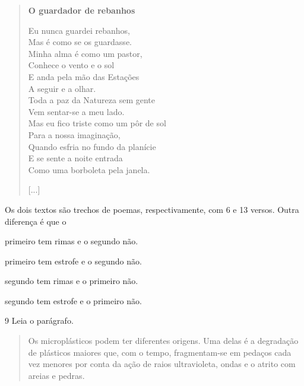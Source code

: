 \begin{verse}
\textbf{O guardador de rebanhos}

Eu nunca guardei rebanhos,\\
Mas é como se os guardasse.\\
Minha alma é como um pastor,\\
Conhece o vento e o sol\\
E anda pela mão das Estações\\
A seguir e a olhar.\\
Toda a paz da Natureza sem gente\\
Vem sentar-se a meu lado.\\
Mas eu fico triste como um pôr de sol\\
Para a nossa imaginação,\\
Quando esfria no fundo da planície\\
E se sente a noite entrada\\
Como uma borboleta pela janela.

{[}...{]}

\end{verse}

Os dois textos são trechos de poemas, respectivamente, com 6 e 13
versos. Outra diferença é que o

\begin{escolha}
\item primeiro tem rimas e o segundo não.

\item primeiro tem estrofe e o segundo não.

\item segundo tem rimas e o primeiro não.

\item segundo tem estrofe e o primeiro não.
\end{escolha}


\num{9} Leia o parágrafo.

\begin{quote}
Os microplásticos podem ter diferentes origens. Uma delas é a degradação
de plásticos maiores que, com o tempo, fragmentam-se em pedaços cada vez
menores por conta da ação de raios ultravioleta, ondas e o atrito com
areias e pedras.

\end{quote}

